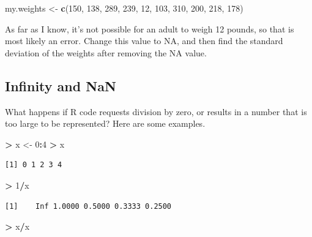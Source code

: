 \documentclass[
]{krantz}
\makeatletter
\newenvironment{Shaded}{\begin{snugshade}}{\end{snugshade}}
\newcommand{\DecValTok}[1]{\textcolor[rgb]{0.06,0.06,0.06}{#1}}
\newcommand{\KeywordTok}[1]{\textcolor[rgb]{0.27,0.27,0.27}{\textbf{#1}}}
\newcommand{\NormalTok}[1]{#1}
\newcommand{\OperatorTok}[1]{\textcolor[rgb]{0.43,0.43,0.43}{\textbf{#1}}}
\newcommand{\StringTok}[1]{\textcolor[rgb]{0.5,0.5,0.5}{#1}}
\newenvironment{kframe}{%
\medskip{}
\setlength{\fboxsep}{.8em}
 \def\at@end@of@kframe{}%
 \ifinner\ifhmode%
  \def\at@end@of@kframe{\end{minipage}}%
  \begin{minipage}{\columnwidth}%
 \fi\fi%
 \def\FrameCommand##1{\hskip\@totalleftmargin \hskip-\fboxsep
 \colorbox{shadecolor}{##1}\hskip-\fboxsep
     \hskip-\linewidth \hskip-\@totalleftmargin \hskip\columnwidth}%
 \MakeFramed {\advance\hsize-\width
   \@totalleftmargin\z@ \linewidth\hsize
   \@setminipage}}%
 {\par\unskip\endMakeFramed%
 \at@end@of@kframe}
\renewenvironment{Shaded}{\begin{kframe}}{\end{kframe}}
\makeatother
\begin{document}
\begin{Shaded}
\begin{Highlighting}[]
\NormalTok{my.weights \textless{}{-}}\StringTok{ }\KeywordTok{c}\NormalTok{(}\DecValTok{150}\NormalTok{, }\DecValTok{138}\NormalTok{, }\DecValTok{289}\NormalTok{, }\DecValTok{239}\NormalTok{, }\DecValTok{12}\NormalTok{, }\DecValTok{103}\NormalTok{, }\DecValTok{310}\NormalTok{, }\DecValTok{200}\NormalTok{, }\DecValTok{218}\NormalTok{, }\DecValTok{178}\NormalTok{)}
\end{Highlighting}
\end{Shaded}

As far as I know, it's not possible for an adult to weigh 12 pounds, so that is most likely an error. Change this value to NA, and then find the standard deviation of the weights after removing the NA value.

\hypertarget{infinity-and-nan}{%
\subsection{Infinity and NaN}\label{infinity-and-nan}}

What happens if R code requests division by zero, or results in a number that is too large to be represented? Here are some examples.

\begin{Shaded}
\begin{Highlighting}[]
\OperatorTok{\textgreater{}}\StringTok{ }\NormalTok{x \textless{}{-}}\StringTok{ }\DecValTok{0}\OperatorTok{:}\DecValTok{4}
\OperatorTok{\textgreater{}}\StringTok{ }\NormalTok{x}
\end{Highlighting}
\end{Shaded}

\begin{verbatim}
[1] 0 1 2 3 4
\end{verbatim}

\begin{Shaded}
\begin{Highlighting}[]
\OperatorTok{\textgreater{}}\StringTok{ }\DecValTok{1}\OperatorTok{/}\NormalTok{x}
\end{Highlighting}
\end{Shaded}

\begin{verbatim}
[1]    Inf 1.0000 0.5000 0.3333 0.2500
\end{verbatim}

\begin{Shaded}
\begin{Highlighting}[]
\OperatorTok{\textgreater{}}\StringTok{ }\NormalTok{x}\OperatorTok{/}\NormalTok{x}
\end{Highlighting}
\end{Shaded}
\end{document}
